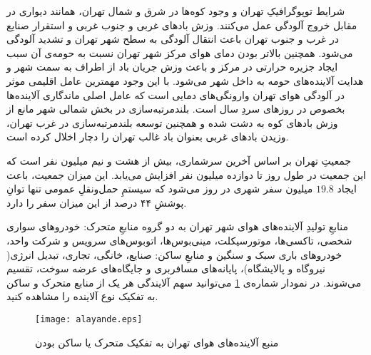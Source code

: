 \documentclass[12pt]{atu}
\begin{document}
شرایط توپوگرافیکِ تهران و وجود کوه‌ها در شرق و شمال تهران، همانند دیواری در مقابل خروج آلودگی عمل می‌کنند. وزش بادهای غربی و جنوب غربی و استقرار صنایع در غرب و جنوب تهران باعث انتقال آلودگی به سطح شهر تهران و تشدید آلودگی می‌شود. همچنین بالاتر بودن دمای هوای مرکز شهر تهران نسبت به حومه‌‌ی آن سبب ایجاد جزیره حرارتی در مرکز و باعث وزش جریان باد از اطراف به سمت شهر و هدایت آلاینده‌های حومه به داخل شهر می‌شود. با این وجود مهمترین عامل اقلیمی موثر در آلودگی هوای تهران وارونگی‌های دمایی است که عامل اصلی ماندگاری آلاینده‌ها بخصوص در روزهای سردِ سال است.\cite{safavi}\cite{lashkari}
بلندمرتبه‌سازی در بخش شمالی شهر مانع از وزش بادهای کوه به دشت شده و همچنین توسعه بلندمرتبه‌سازی در غرب تهران، وزیدن بادهای غربی بعنوان باد غالب تهران را دچار اخلال کرده است.\cite{salighe}

جمعیتِ تهران بر اساس آخرین سرشماری، بیش از هشت و نیم میلیون نفر است که این جمعیت در طول روز تا دوازده میلیون نفر افزایش می‌یابد.
\cite{tehranairworldbank}
این میزان جمعیت، باعث ایجاد  $19.8$ میلیون سفر شهری در روز می‌شود که سیستمِ حمل‌و‌نقلِ عمومی تنها توانِ پوششِ ۴۴ درصد
  از این میزان سفر را دارد.
\cite{amarname1400}

منابعِ تولیدِ آلاینده‌های هوای شهر تهران به دو گروه منابعِ متحرک: خودروهای سواری شخصی، تاکسی‌ها، موتورسیکلت، مینی‌بوس‌ها، اتوبوس‌های سرویس و شرکت واحد، خودروهای باری سبک و سنگین و منابعِ ساکن: صنایع، خانگی، تجاری، تبدیل انرژی( نیروگاه و پالایشگاه)، پایانه‌های مسافربری و جایگاه‌های عرضه سوخت، تقسیم می‌شوند. در نمودار شماره‌ی 
\ref{fig:alayande}
می‌توانید سهم آلایندگی هر یک از منابع متحرک و ساکن به تفکیک نوع آلاینده را مشاهده کنید.
\cite{hemayat1400}

\vspace{-0.4cm}
\begin{figure}[!ht]
	\centering
	\texttt{[image: alayande.eps]}
	\caption{منبع آلاینده‌های هوای تهران به تفکیک متحرک یا ساکن بودن} \label{fig:alayande}
\end{figure}
\vspace{-0.4cm}
\end{document}
